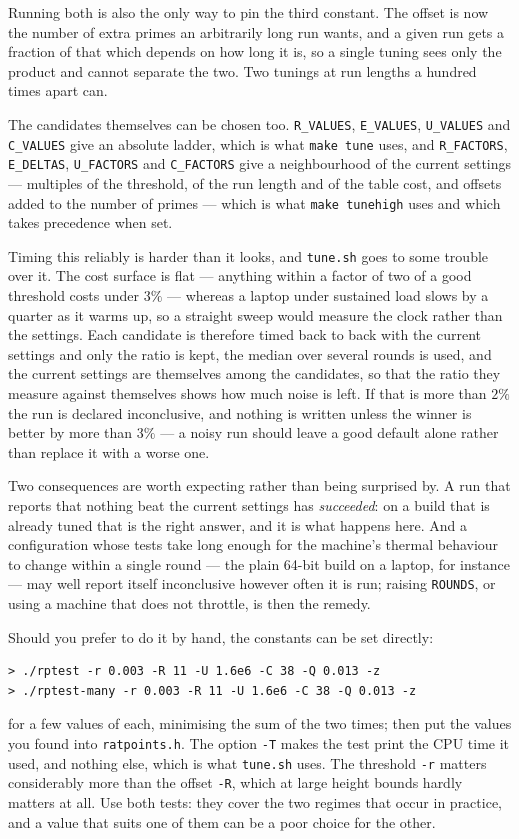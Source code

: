 \documentclass[12pt,a4paper,oneside]{amsart}
\begin{document}
Running both is also the only way to pin the third constant. The offset is
now the number of extra primes an arbitrarily long run wants, and a given run
gets a fraction of that which depends on how long it is, so a single tuning
sees only the product and cannot separate the two. Two tunings at run lengths
a hundred times apart can.

The candidates themselves can be chosen too. \texttt{R\_VALUES},
\texttt{E\_VALUES}, \texttt{U\_VALUES} and \texttt{C\_VALUES} give an
absolute ladder, which is what \texttt{make tune} uses, and
\texttt{R\_FACTORS}, \texttt{E\_DELTAS}, \texttt{U\_FACTORS} and
\texttt{C\_FACTORS} give a neighbourhood of the current settings ---
multiples of the threshold, of the run length and of the table cost, and
offsets added to the number of primes --- which is what \texttt{make
tunehigh} uses and which takes precedence when set.

Timing this reliably is harder than it looks, and \texttt{tune.sh} goes to
some trouble over it. The cost surface is flat --- anything within a factor of
two of a good threshold costs under $3\%$ --- whereas a laptop under sustained
load slows by a quarter as it warms up, so a straight sweep would measure the
clock rather than the settings. Each candidate is therefore timed back to back
with the current settings and only the ratio is kept, the median over several
rounds is used, and the current settings are themselves among the candidates,
so that the ratio they measure against themselves shows how much noise is
left. If that is more than $2\%$ the run is declared inconclusive, and
nothing is written unless the winner is better by more than $3\%$ --- a noisy
run should leave a good default alone rather than replace it with a worse one.

Two consequences are worth expecting rather than being surprised by. A run
that reports that nothing beat the current settings has \emph{succeeded}: on a
build that is already tuned that is the right answer, and it is what happens
here. And a configuration whose tests take long enough for the machine's
thermal behaviour to change within a single round --- the plain 64-bit build on
a laptop, for instance --- may well report itself inconclusive however often it
is run; raising \texttt{ROUNDS}, or using a machine that does not throttle,
is then the remedy.

Should you prefer to do it by hand, the constants can be set directly:
\begin{verbatim}
> ./rptest -r 0.003 -R 11 -U 1.6e6 -C 38 -Q 0.013 -z
> ./rptest-many -r 0.003 -R 11 -U 1.6e6 -C 38 -Q 0.013 -z
\end{verbatim}
for a few values of each, minimising the sum of the two times; then put the
values you found into \texttt{ratpoints.h}. The option \verb+-T+ makes the
test print the CPU time it used, and nothing else, which is what
\texttt{tune.sh} uses. The threshold \verb+-r+ matters considerably more
than the offset \verb+-R+, which at large height bounds hardly matters at
all. Use both tests: they cover the two regimes that occur in practice, and a
value that suits one of them can be a poor choice for the other.
\end{document}
